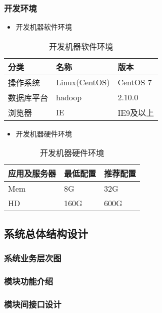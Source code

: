 \subsubsection{开发环境}
\begin{itemize}
	\item 开发机器软件环境
\end{itemize}
\begin{table}[!htbp]
	\centering
	\caption{开发机器软件环境}
	\label{tab:my-table2}
	\begin{tabular}{|l|l|l|}
		\hline
		分类 & 名称 & 版本 \\ \hline
		操作系统 & Linux(CentOS) & CentOS 7  \\ \hline
		数据库平台 & hadoop & 2.10.0  \\ \hline
		浏览器 & IE & IE9及以上  \\ \hline
	\end{tabular}
\end{table}
\begin{itemize}
	\item 开发机器硬件环境
\end{itemize}	
\begin{table}[!htbp]
	\centering
	\caption{开发机器硬件环境}
	\label{tab:my-table3}
	\begin{tabular}{|l|l|l|}
		\hline
		应用及服务器 & 最低配置 & 推荐配置 \\ \hline
		Mem & 8G & 32G \\ \hline
		HD & 160G & 600G \\ \hline
	\end{tabular}
\end{table}

\subsection{系统总体结构设计}

\subsubsection{系统业务层次图}


\subsubsection{模块功能介绍}


\subsubsection{模块间接口设计}
